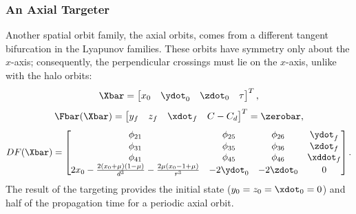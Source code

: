 \subsubsection{An Axial Targeter}
Another spatial orbit family, the axial orbits, comes from a different tangent bifurcation in the
Lyapunov families. These orbits have symmetry only about the $x$-axis; consequently, the
perpendicular crossings must lie on the $x$-axis, unlike with the halo orbits:
\begin{equation}
    \Xbar=\begin{bmatrix}   x_{0}   &   \ydot_{0}   &   \zdot_{0}   &   \tau    \end{bmatrix}^{T},
    \label{eq:axialfreevar}
\end{equation}
\vspace{1mm}
\begin{equation}
    \Fbar(\Xbar)=\begin{bmatrix}    y_{f}   &   z_{f}   &   \xdot_{f}   &   C-C_{d} \end{bmatrix}^{T}=\zerobar,
    \label{eq:axialconst}
\end{equation}
\vspace{1mm}
\begin{equation}
    DF(\Xbar)=\begin{bmatrix}   \phi_{21}                                                                   &   \phi_{25}   &   \phi_{26}   &   \ydot_{f}   \\
                                \phi_{31}                                                                   &   \phi_{35}   &   \phi_{36}   &   \zdot_{f}   \\
                                \phi_{41}                                                                   &   \phi_{45}   &   \phi_{46}   &   \xddot_{f}  \\
                                2x_{0}-\frac{2(x_{0}+\mu)(1-\mu)}{d^{3}}-\frac{2\mu(x_{0}-1+\mu)}{r^{3}}    &   -2\ydot_{0} &   -2\zdot_{0} &   0           \end{bmatrix}.
    \label{eq:axialjacobian}
\end{equation}
The result of the targeting provides the initial state ($y_{0}=z_{0}=\xdot_{0}=0$) and half of the
propagation time for a periodic axial orbit.
\vspace{20mm}

